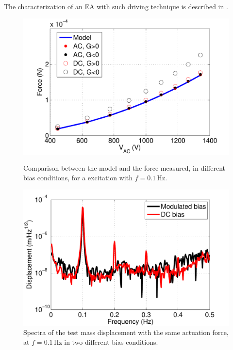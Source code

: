 The characterization of an EA with such driving technique is described in \cite{ElDrive}.
\begin{figure}
\begin{minipage}{0.47\textwidth}
\begin{center}
\includegraphics[width=\textwidth]{Sec_Suspensions/Figures/Measure1.pdf}   
\caption{\label{fig:measure1} Comparison between the model and the force measured, in different bias conditions, for a excitation with $f=0.1$\,Hz.}
\end{center}
\end{minipage}
\hspace{0.5cm}
\begin{minipage}{0.47\textwidth}
\begin{center}
\includegraphics[width=\textwidth]{Sec_Suspensions/Figures/Charge.pdf}
\caption{\label{fig:charge} Spectra of the test mass displacement with the same actuation force, at $f=0.1$\,Hz in two different bias conditions.}
\end{center}
\end{minipage}
\end{figure}
